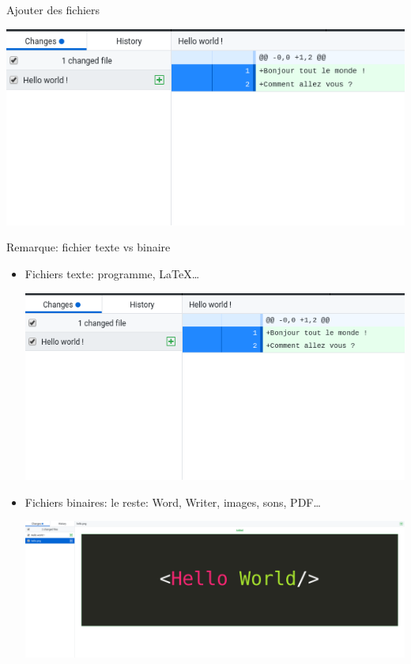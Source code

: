 \documentclass{beamer}
\begin{document}
\begin{frame}{Ajouter des fichiers}
    \begin{center}
        \includegraphics[width=\textwidth]{img/github_desktop/see_added.png}
    \end{center}
\end{frame}

\begin{frame}{Remarque: fichier texte vs binaire}
    \begin{itemize}
        \item Fichiers texte: programme, \LaTeX\dots\\
            \begin{center}
                \includegraphics[width=.75\textwidth]{img/github_desktop/see_added.png}\\
            \end{center}
        \item Fichiers binaires: le reste: Word, Writer, images, sons, PDF\dots\\
            \begin{center}
                \includegraphics[width=.75\textwidth]{img/github_desktop/binary_file.png}
            \end{center}
    \end{itemize}
\end{frame}
\end{document}
